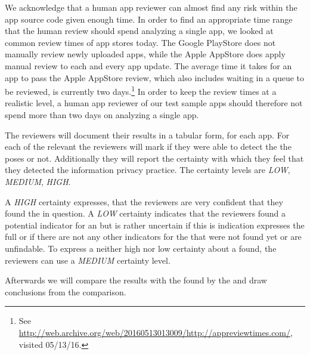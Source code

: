 We acknowledge that a human app reviewer can almost find any \ipp risk within the app source code given enough time.
In order to find an appropriate time range that the human review should spend analyzing a single app, we looked at common review times of app stores today.
The Google PlayStore does not manually review newly uploaded apps, while the Apple AppStore does apply manual review to each and every app update.
The average time it takes for an app to pass the Apple AppStore review, which also includes waiting in a queue to be reviewed, is currently two days.\footnote{See \url{http://web.archive.org/web/20160513013009/http://appreviewtimes.com/}, visited 05/13/16.}
In order to keep the review times at a realistic level, a human app reviewer of our test sample apps should therefore not spend more than two days on analyzing a single app.

The reviewers will document their results in a tabular form, for each app.
For each of the relevant \ipp the reviewers will mark if they were able to detect the \ipr the \ipp poses or not.
Additionally they will report the certainty with which they feel that they detected the information privacy practice.
The certainty levels are \textit{LOW}, \textit{MEDIUM}, \textit{HIGH}.

A \textit{HIGH} certainty expresses, that the reviewers are very confident that they found the \ipp in question.
A \textit{LOW} certainty indicates that the reviewers found a potential indicator for an \ipp but is rather uncertain if this is indication expresses the full \ipp or if there are not any other indicators for the \ipp that were not found yet or are unfindable.
To express a neither high nor low certainty about a \ipp found, the reviewers can use a \textit{MEDIUM} certainty level.

Afterwards we will compare the results with the \ipr found by the \aiprat and draw conclusions from the comparison.